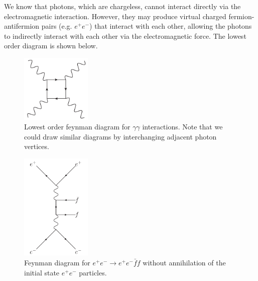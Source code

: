 We know that photons, which are chargeless, cannot interact directly via the electromagnetic interaction.
However, they may produce virtual charged fermion-antifermion pairs (e.g. $e^{+}e^{-}$) that interact with each other, allowing the photons to indirectly interact with each other via the electromagnetic force.
The lowest order diagram is shown below.

\begin{figure}[H]
\begin{center}
\includegraphics[width=0.3\textwidth]{prob2/prob2.pdf}
\end{center}
\caption{Lowest order feynman diagram for $\gamma\gamma$ interactions. Note that we could draw similar diagrams by interchanging adjacent photon vertices.}
\label{fig:delbruck-diagram}
\end{figure}



\begin{figure}[H]
\begin{center}
\includegraphics[width=0.3\textwidth]{prob3/prob3_graph.pdf}
\end{center} 
\caption{Feynman diagram for $e^{+}e^{-} \rightarrow e^{+}e^{-}\bar{f}f$ without annihilation of the initial state $e^{+}e^{-}$ particles.}
\label{fig:prob3-fig}
\end{figure}

